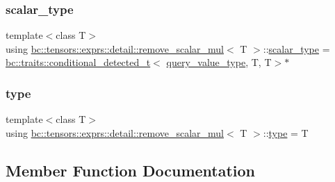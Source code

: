\subsubsection{\texorpdfstring{scalar\+\_\+type}{scalar\_type}}
{\footnotesize\ttfamily template$<$class T$>$ \\
using \hyperlink{structbc_1_1tensors_1_1exprs_1_1detail_1_1remove__scalar__mul}{bc\+::tensors\+::exprs\+::detail\+::remove\+\_\+scalar\+\_\+mul}$<$ T $>$\+::\hyperlink{structbc_1_1tensors_1_1exprs_1_1detail_1_1remove__scalar__mul_a9732e37c5848f3501c4f715c537e3a0f}{scalar\+\_\+type} =  \hyperlink{namespacebc_1_1traits_a1a6d378947ec32acd457890854bcd592}{bc\+::traits\+::conditional\+\_\+detected\+\_\+t}$<$ \hyperlink{namespacebc_1_1tensors_1_1exprs_1_1detail_aa60e0a71bcf8048661b38b904c620fb0}{query\+\_\+value\+\_\+type}, T, T$>$$\ast$}

\mbox{\label{structbc_1_1tensors_1_1exprs_1_1detail_1_1remove__scalar__mul_a5818f6f0ff263d6c03e59e71293b0ec9}} 
\subsubsection{\texorpdfstring{type}{type}}
{\footnotesize\ttfamily template$<$class T$>$ \\
using \hyperlink{structbc_1_1tensors_1_1exprs_1_1detail_1_1remove__scalar__mul}{bc\+::tensors\+::exprs\+::detail\+::remove\+\_\+scalar\+\_\+mul}$<$ T $>$\+::\hyperlink{structbc_1_1tensors_1_1exprs_1_1detail_1_1remove__scalar__mul_a5818f6f0ff263d6c03e59e71293b0ec9}{type} =  T}



\subsection{Member Function Documentation}
\mbox{\label{structbc_1_1tensors_1_1exprs_1_1detail_1_1remove__scalar__mul_a62e9da47845971edc6e698466e888d05}} 

